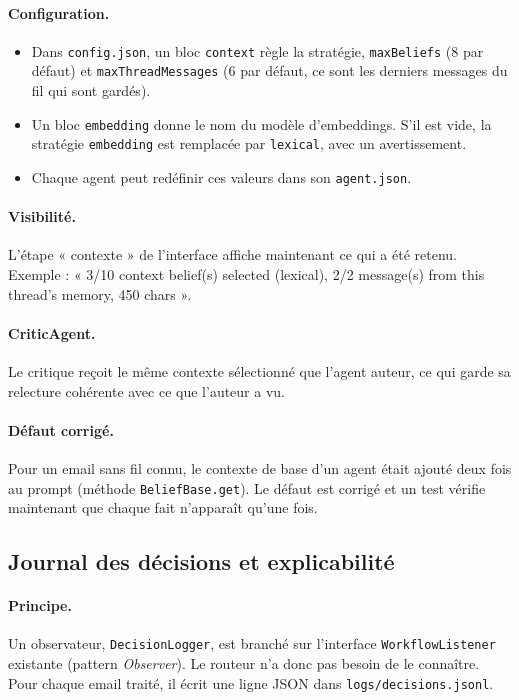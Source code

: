 \documentclass[11pt,a4paper]{article}
\newcommand{\code}[1]{\texttt{#1}}
\begin{document}
\paragraph{Configuration.}
\begin{itemize}
  \item Dans \code{config.json}, un bloc \code{context} règle la stratégie,
        \code{maxBeliefs} (8 par défaut) et \code{maxThreadMessages} (6 par défaut, ce
        sont les derniers messages du fil qui sont gardés).
  \item Un bloc \code{embedding} donne le nom du modèle d'embeddings. S'il est vide, la
        stratégie \code{embedding} est remplacée par \code{lexical}, avec un avertissement.
  \item Chaque agent peut redéfinir ces valeurs dans son \code{agent.json}.
\end{itemize}

\paragraph{Visibilité.} L'étape « contexte » de l'interface affiche maintenant ce qui a
été retenu. Exemple : « 3/10 context belief(s) selected (lexical), 2/2 message(s) from
this thread's memory, 450 chars ».

\paragraph{CriticAgent.} Le critique reçoit le même contexte sélectionné que l'agent
auteur, ce qui garde sa relecture cohérente avec ce que l'auteur a vu.

\paragraph{Défaut corrigé.} Pour un email sans fil connu, le contexte de base d'un agent
était ajouté deux fois au prompt (méthode \code{BeliefBase.get}). Le défaut est corrigé et
un test vérifie maintenant que chaque fait n'apparaît qu'une fois.

\subsection{Journal des décisions et explicabilité}
\label{sec:journal}

\paragraph{Principe.} Un observateur, \code{DecisionLogger}, est branché sur l'interface
\code{WorkflowListener} existante (pattern \emph{Observer}). Le routeur n'a donc pas besoin
de le connaître. Pour chaque email traité, il écrit une ligne JSON dans
\code{logs/decisions.jsonl}.
\end{document}
